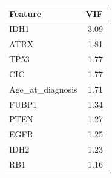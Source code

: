 \begin{tabular}{lr}
\toprule
\textbf{Feature} & \textbf{VIF} \\
\midrule
IDH1 & 3.09 \\
ATRX & 1.81 \\
TP53 & 1.77 \\
CIC & 1.77 \\
Age\_at\_diagnosis & 1.71 \\
FUBP1 & 1.34 \\
PTEN & 1.27 \\
EGFR & 1.25 \\
IDH2 & 1.23 \\
RB1 & 1.16 \\
\bottomrule
\end{tabular}
